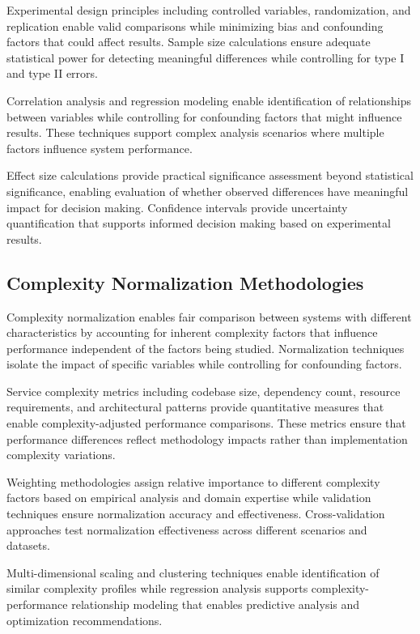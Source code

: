 Experimental design principles including controlled variables, randomization, and replication enable valid comparisons while minimizing bias and confounding factors that could affect results. Sample size calculations ensure adequate statistical power for detecting meaningful differences while controlling for type I and type II errors.

Correlation analysis and regression modeling enable identification of relationships between variables while controlling for confounding factors that might influence results. These techniques support complex analysis scenarios where multiple factors influence system performance.

Effect size calculations provide practical significance assessment beyond statistical significance, enabling evaluation of whether observed differences have meaningful impact for decision making. Confidence intervals provide uncertainty quantification that supports informed decision making based on experimental results.

\subsection{Complexity Normalization Methodologies}

Complexity normalization enables fair comparison between systems with different characteristics by accounting for inherent complexity factors that influence performance independent of the factors being studied. Normalization techniques isolate the impact of specific variables while controlling for confounding factors.

Service complexity metrics including codebase size, dependency count, resource requirements, and architectural patterns provide quantitative measures that enable complexity-adjusted performance comparisons. These metrics ensure that performance differences reflect methodology impacts rather than implementation complexity variations.

Weighting methodologies assign relative importance to different complexity factors based on empirical analysis and domain expertise while validation techniques ensure normalization accuracy and effectiveness. Cross-validation approaches test normalization effectiveness across different scenarios and datasets.

Multi-dimensional scaling and clustering techniques enable identification of similar complexity profiles while regression analysis supports complexity-performance relationship modeling that enables predictive analysis and optimization recommendations.

